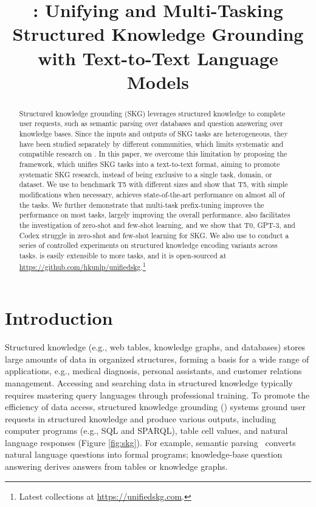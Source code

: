 \title{\uskg: Unifying and Multi-Tasking Structured Knowledge Grounding with Text-to-Text Language Models}



\maketitle

\begin{abstract}

Structured knowledge grounding (SKG) leverages structured knowledge to complete user requests, such as semantic parsing over databases and question answering over knowledge bases. 
Since the inputs and outputs of SKG tasks are heterogeneous, they have been studied separately by different communities, which limits systematic and compatible research on \skg. 
In this paper, we overcome this limitation by proposing the \uskg framework, which unifies \ntasks SKG tasks into a text-to-text format, aiming to promote systematic SKG research, instead of being exclusive to a single task, \mbox{domain}, or dataset.
We use \uskg to benchmark T5 with different sizes and show that T5, with simple modifications when necessary, achieves state-of-the-art performance on almost all of the \ntasks tasks. 
We further demonstrate that multi-task prefix-tuning improves the performance on most tasks, largely improving the overall performance. 
\uskg also facilitates the investigation of zero-shot and few-shot learning, and we show that T0, GPT-3, and Codex struggle in zero-shot and few-shot learning for SKG. 
We also use \uskg to conduct a series of controlled experiments on structured knowledge encoding variants across \skg tasks. 
\uskg is easily extensible to more tasks, and it is open-sourced at \url{https://github.com/hkunlp/unifiedskg}.\footnote{Latest collections at \url{https://unifiedskg.com}.}

\end{abstract}

\section{Introduction}

Structured knowledge (e.g., web tables, knowledge graphs, and databases) stores large amounts of data in organized structures, forming a basis for a wide range of applications, e.g., medical diagnosis, personal assistants, and customer relations management.
Accessing and searching data in structured knowledge typically requires mastering query languages through professional training.
To promote the efficiency of data access, structured knowledge grounding (\skg) systems ground user requests in structured knowledge and produce various outputs, including computer programs (e.g., SQL and SPARQL), table cell values, and natural language responses (Figure \ref{fig:skg}). 
For example, semantic parsing~\cite{ZelleM96,Zettlemoyer05} converts natural language questions into formal programs;
knowledge-base question answering \cite{BerantCFL13} derives answers from tables or knowledge graphs.

